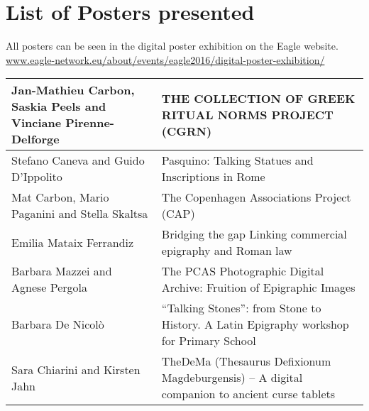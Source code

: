 
\chapter{List of Posters presented}\label{posterslist}

\begin{sloppypar}
All posters can be seen in the digital poster exhibition on the Eagle website.
\url{www.eagle-network.eu/about/events/eagle2016/digital-poster-exhibition/}

\end{sloppypar}

\begin{table}
{\small
\addtolength{\tabcolsep}{-0.8mm}

\begin{tabular*}{\textwidth}{p{4.5cm}|p{6cm}}
%    
%    
%
%    
%   
\toprule Jan-Mathieu Carbon, Saskia Peels and Vinciane Pirenne-Delforge & THE COLLECTION OF GREEK RITUAL NORMS PROJECT (CGRN) \\\hline
Stefano Caneva and Guido D'Ippolito & Pasquino: Talking Statues and Inscriptions in Rome\\\hline
Mat Carbon, Mario Paganini and Stella Skaltsa & The Copenhagen Associations Project (CAP)\\\hline
Emilia Mataix Ferrandiz & Bridging the gap Linking commercial epigraphy and Roman law\\\hline
Barbara Mazzei and Agnese Pergola & The PCAS Photographic Digital Archive: Fruition of Epigraphic Images\\\hline
Barbara De Nicolò & “Talking Stones”: from Stone to History. A Latin Epigraphy workshop for Primary School\\\hline
Sara Chiarini and Kirsten Jahn & TheDeMa (Thesaurus Defixionum Magdeburgensis) – A digital companion to ancient curse tablets\\\hline

\end{tabular*}}
\end{table}
